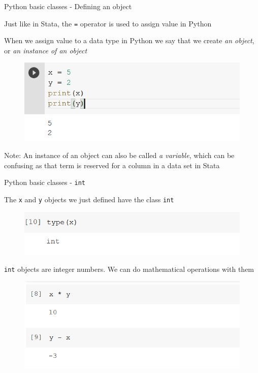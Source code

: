 \documentclass[aspectratio=169]{beamer}
\begin{document}
\begin{frame}{Python basic classes - Defining an object}

	Just like in Stata, the \texttt{=} operator is used to assign value in Python
	
	When we assign value to a data type in Python we say that we create \textit{an object},
	or \textit{an instance of an object}

	\begin{figure}
		\centering
		\includegraphics[width=0.6\linewidth]{img/assignation.png}
	\end{figure}

	Note: An instance of an object can also be called \textit{a variable},
	which can be confusing as that term is reserved for a column in a data set in Stata

\end{frame}

\begin{frame}{Python basic classes - \texttt{int}}

	The \texttt{x} and \texttt{y} objects we just defined have the class \texttt{int}

	\begin{figure}
		\centering
		\includegraphics[width=0.6\linewidth]{img/type_int.png}
	\end{figure}

	\texttt{int} objects are integer numbers. We can do mathematical operations with them
	\begin{figure}
		\centering
		\includegraphics[width=0.6\linewidth]{img/math_integers.png}
	\end{figure}

\end{frame}
\end{document}
